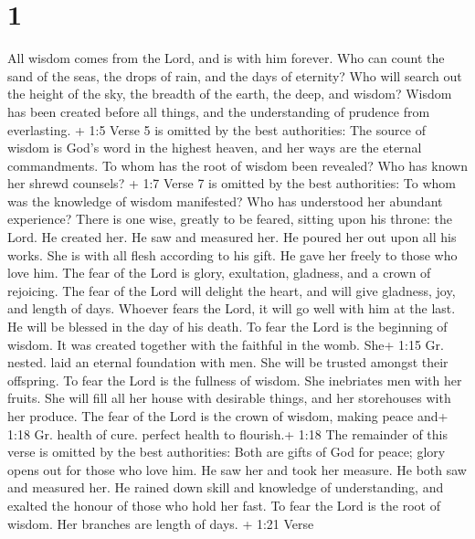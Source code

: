 \hypertarget{section}{%
\section{1}\label{section}}

 All wisdom comes from the Lord, and is with him forever.
 Who can count the sand of the seas, the drops of rain, and
the days of eternity?  Who will search out the height of the
sky, the breadth of the earth, the deep, and wisdom?  Wisdom
has been created before all things, and the understanding of prudence
from everlasting.  + 1:5 Verse 5 is omitted by the best
authorities: The source of wisdom is God's word in the highest heaven,
and her ways are the eternal commandments.  To whom has the
root of wisdom been revealed? Who has known her shrewd counsels?
 + 1:7 Verse 7 is omitted by the best authorities: To whom
was the knowledge of wisdom manifested? Who has understood her abundant
experience?  There is one wise, greatly to be feared,
sitting upon his throne: the Lord.  He created her. He saw
and measured her. He poured her out upon all his works. 
She is with all flesh according to his gift. He gave her freely to those
who love him.  The fear of the Lord is glory, exultation,
gladness, and a crown of rejoicing.  The fear of the Lord
will delight the heart, and will give gladness, joy, and length of days.
 Whoever fears the Lord, it will go well with him at the
last. He will be blessed in the day of his death.  To fear
the Lord is the beginning of wisdom. It was created together with the
faithful in the womb.  She+ 1:15 Gr. nested. laid an
eternal foundation with men. She will be trusted amongst their
offspring.  To fear the Lord is the fullness of wisdom. She
inebriates men with her fruits.  She will fill all her
house with desirable things, and her storehouses with her produce.
 The fear of the Lord is the crown of wisdom, making peace
and+ 1:18 Gr. health of cure. perfect health to flourish.+ 1:18 The
remainder of this verse is omitted by the best authorities: Both are
gifts of God for peace; glory opens out for those who love him. He saw
her and took her measure.  He both saw and measured her. He
rained down skill and knowledge of understanding, and exalted the honour
of those who hold her fast.  To fear the Lord is the root
of wisdom. Her branches are length of days.  + 1:21 Verse
